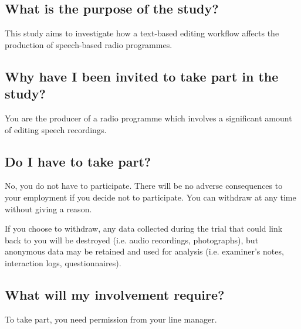 \subsection{What is the purpose of the study?}
This study aims to investigate how a text-based editing workflow affects the
production of speech-based radio programmes.

\subsection{Why have I been invited to take part in the study?}
You are the producer of a radio programme which involves a significant amount
of editing speech recordings.

\subsection{Do I have to take part?}
No, you do not have to participate. There will be no adverse consequences to
your employment if you decide not to participate. You can withdraw at any time
without giving a reason.

If you choose to withdraw, any data collected during the trial that could link
back to you will be destroyed (i.e. audio recordings, photographs), but
anonymous data may be retained and used for analysis (i.e. examiner’s notes,
interaction logs, questionnaires).

\subsection{What will my involvement require?}
To take part, you need permission from your line manager.

